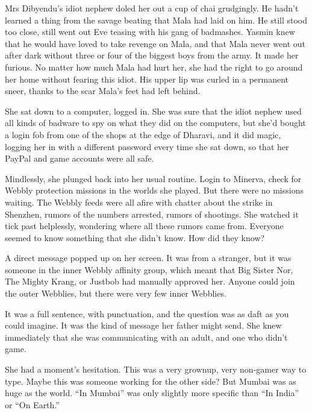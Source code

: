 Mrs Dibyendu's idiot nephew doled her out a cup of chai grudgingly.
He hadn't learned a thing from the savage beating that Mala had
laid on him. He still stood too close, still went out Eve teasing
with his gang of badmashes. Yasmin knew that he would have loved to
take revenge on Mala, and that Mala never went out after dark
without three or four of the biggest boys from the army. It made
her furious. No matter how much Mala had hurt her, she had the
right to go around her home without fearing this idiot. His upper
lip was curled in a permanent sneer, thanks to the scar Mala's feet
had left behind.

She sat down to a computer, logged in. She was sure that the idiot
nephew used all kinds of badware to spy on what they did on the
computers, but she'd bought a login fob from one of the shops at
the edge of Dharavi, and it did magic, logging her in with a
different password every time she sat down, so that her PayPal and
game accounts were all safe.

Mindlessly, she plunged back into her usual routine. Login to
Minerva, check for Webbly protection missions in the worlds she
played. But there were no missions waiting. The Webbly feeds were
all afire with chatter about the strike in Shenzhen, rumors of the
numbers arrested, rumors of shootings. She watched it tick past
helplessly, wondering where all these rumors came from. Everyone
seemed to know something that she didn't know. How did they know?

A direct message popped up on her screen. It was from a stranger,
but it was someone in the inner Webbly affinity group, which meant
that Big Sister Nor, The Mighty Krang, or Justbob had manually
approved her. Anyone could join the outer Webblies, but there were
very few inner Webblies.


It was a full sentence, with punctuation, and the question was as
daft as you could imagine. It was the kind of message her father
might send. She knew immediately that she was communicating with an
adult, and one who didn't game.



She had a moment's hesitation. This was a very grownup, very
non-gamer way to type. Maybe this was someone working for the other
side? But Mumbai was as huge as the world. ``In Mumbai'' was only
slightly more specific than ``In India'' or ``On Earth.''

